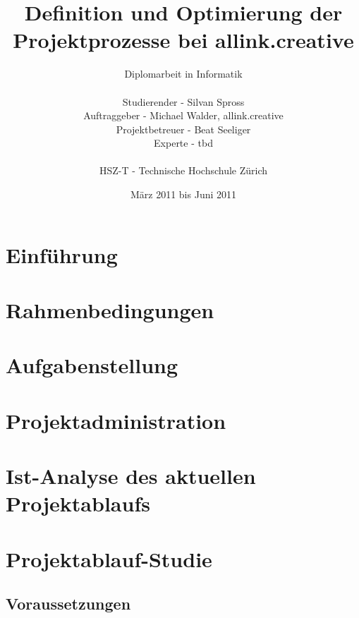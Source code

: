 \documentclass[
11pt, %
a4paper, %
BCOR25mm, %
DIV14, %
footsepline = false, %
headsepline, %
twoside, %
openright,
abstracton, %
listof=totocnumbered, %
bibliography=totocnumbered %
]{scrreprt}
\title{Definition und Optimierung der Projektprozesse bei allink.creative}
\author{Diplomarbeit in Informatik\\
    \\
    Studierender - Silvan Spross\\
	Auftraggeber - Michael Walder, allink.creative\\
    Projektbetreuer - Beat Seeliger\\
    Experte - tbd\\
	\\
	HSZ-T - Technische Hochschule Zürich}
\date{März 2011 bis Juni 2011}
\begin{document}
  \ifpdf
  \else
  \fi
  
  
  \maketitle
  \cleardoublepage

  
  \cleardoublepage

  
  \tableofcontents
  \cleardoublepage
  
  
  \chapter{Einführung}
    
  \cleardoublepage
  
  \chapter{Rahmenbedingungen}
  
  \cleardoublepage
  
  \chapter{Aufgabenstellung}
  
  \cleardoublepage
  
  \chapter{Projektadministration}
  
  \cleardoublepage
  
  \chapter{Ist-Analyse des aktuellen Projektablaufs}
  
  \cleardoublepage
  
  \chapter{Projektablauf-Studie}
  \section{Voraussetzungen}
\end{document}
